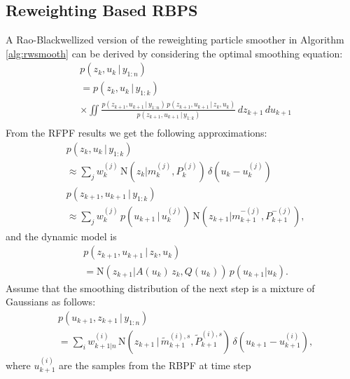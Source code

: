 \documentclass[twocolumn]{autart}    %
\begin{document}
\subsection{Reweighting Based RBPS}
%
A Rao-Blackwellized version of the reweighting particle smoother
in Algorithm \ref{alg:rwsmooth} can be derived by considering
the optimal smoothing equation:
%
\begin{equation}
\begin{split}
 &p(z_{k},u_{k} \,|\, y_{1:n}) \\
 &= p(z_{k},u_{k}\,|\,y_{1:k}) \\
 &\times \iint
    \frac{p(z_{k+1},u_{k+1} \,|\, y_{1:n}) \, p(z_{k+1},u_{k+1}\,|\,z_{k},u_{k})}
         {p(z_{k+1},u_{k+1}\,|\,y_{1:k})} \, dz_{k+1} \, du_{k+1} \\
\end{split}
\end{equation}
%
From the RFPF results we get the following approximations:
%
\begin{equation}
\begin{split}
  &p(z_k,u_{k} \,|\, y_{1:k}) \\
  &\approx \sum_j w_k^{(j)} \, \mathrm{N}(z_{k} | m^{(j)}_{k}, P^{(j)}_{k}) \,
    \delta(u_{k} - u_{k}^{(j)}) \\
  &p(z_{k+1},u_{k+1} \,|\, y_{1:k}) \\
  &\approx \sum_j w_k^{(j)} \, p(u_{k+1}\,|\,u_k^{(j)}) \, \mathrm{N}(z_{k+1} | m^{-(j)}_{k+1}, P^{-(j)}_{k+1}),
\end{split}
\end{equation}
%
and the dynamic model is
%
\begin{equation}
\begin{split}
  &p(z_{k+1},u_{k+1} \,|\, z_{k},u_{k}) \\
  &= \mathrm{N}(z_{k+1} | A(u_k) \, z_k, Q(u_k)) \, p(u_{k+1} | u_k).
\end{split}
\end{equation}
%
Assume that the smoothing distribution of the next step is a mixture
of Gaussians as follows:
%
\begin{equation}
\begin{split}
  &p(u_{k+1},z_{k+1}\,|\,y_{1:n}) \\
  &=
    \sum_{i} w^{(i)}_{k+1|n} \, \mathrm{N}(z_{k+1}\,|\,\tilde{m}_{k+1}^{(i),s},\tilde{P}_{k+1}^{(i),s}) \,
    \delta(u_{k+1} - u_{k+1}^{(i)}),
\end{split}
\end{equation}
%
where $u_{k+1}^{(i)}$ are the samples from the RBPF at time step
\end{document}
